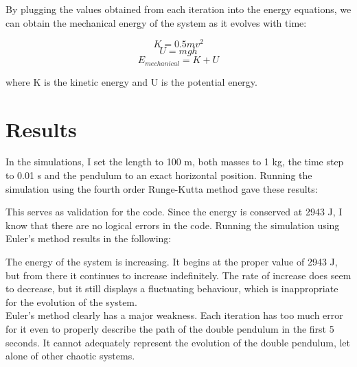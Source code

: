 \documentclass[a4paper,12pt]{article}
\begin{document}
By plugging the values obtained from each iteration into the energy 
equations, we can obtain the mechanical energy of the system as it evolves
with time:

\[ K = 0.5 m v^2 \]
\[ U = mgh \]
\[ E_{mechanical} = K + U \]

where K is the kinetic energy and U is the potential energy.

\section*{Results}

In the simulations, I set the length to 100 m, both masses to 1 kg, the time
step to 0.01 s and the pendulum to an exact horizontal position. Running
the simulation using the fourth order Runge-Kutta method gave these
results: \\


This serves as validation for the code. Since the energy is conserved at
2943 J, I know that there are no logical errors in the code. Running the
simulation using Euler's method results in the following: \\


The energy of the system is increasing. It begins at the proper value of
2943 J, but from there it continues to increase indefinitely. The rate of
increase does seem to decrease, but it still displays a fluctuating
behaviour, which is inappropriate for the evolution of the system. \\

Euler's method clearly has a major weakness. Each iteration has too much
error for it even to properly describe the path of the double pendulum 
in the first 5 seconds. It cannot adequately represent the evolution of 
the double pendulum, let alone of other chaotic systems.
\end{document}
